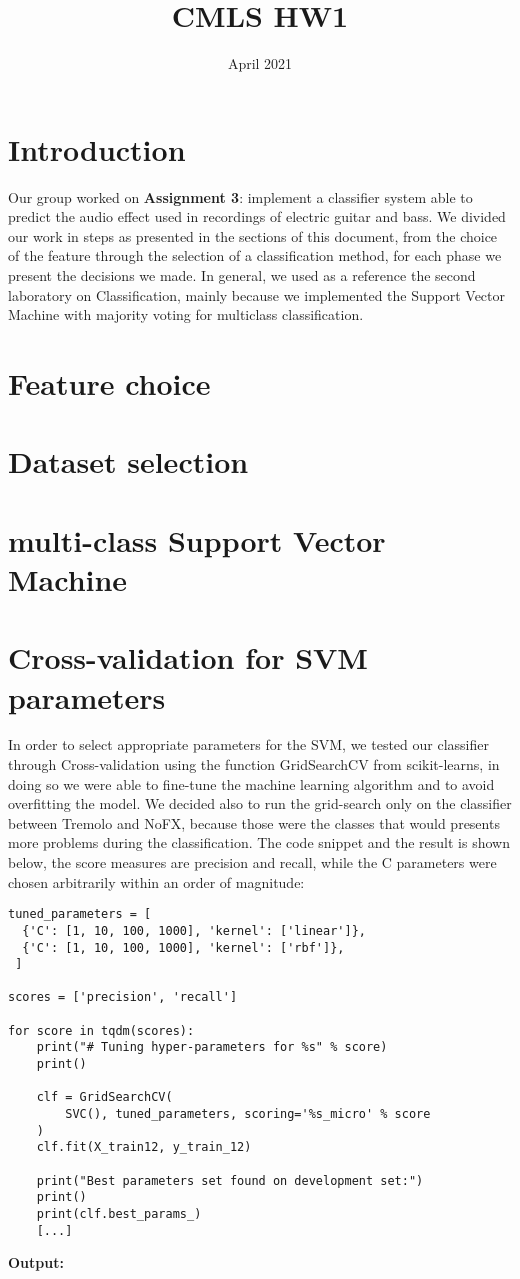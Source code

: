 \documentclass{article}
\title{CMLS HW1}
\author{}
\date{April 2021}
\begin{document}
\maketitle
\section{Introduction}
Our group worked on \textbf{Assignment 3}: implement a classifier system able to predict the audio effect used in recordings of electric guitar and bass. We divided our work in steps as presented in the sections of this document, from the choice of the feature through the selection of a classification method, for each phase we present the decisions we made. In general, we used as a reference the second laboratory on Classification, mainly because we implemented the Support Vector Machine with majority voting for multiclass classification.
\section{Feature choice}
\section{Dataset selection}
\section{multi-class Support Vector Machine}
\section{Cross-validation for SVM parameters}
In order to select appropriate parameters for the SVM, we tested our classifier through Cross-validation using the function GridSearchCV from scikit-learns, in doing so we were able to fine-tune the machine learning algorithm and to avoid overfitting the model. We decided also to run the grid-search only on the classifier between Tremolo and NoFX, because those were the classes that would presents more problems during the classification. The code snippet and the result is shown below, the score measures are precision and recall, while the C parameters were chosen arbitrarily within an order of magnitude:
\begin{verbatim}
tuned_parameters = [
  {'C': [1, 10, 100, 1000], 'kernel': ['linear']},
  {'C': [1, 10, 100, 1000], 'kernel': ['rbf']},
 ]

scores = ['precision', 'recall']

for score in tqdm(scores):
    print("# Tuning hyper-parameters for %s" % score)
    print()

    clf = GridSearchCV(
        SVC(), tuned_parameters, scoring='%s_micro' % score
    )
    clf.fit(X_train12, y_train_12)

    print("Best parameters set found on development set:")
    print()
    print(clf.best_params_)
    [...]
\end{verbatim}
\hfill \break
\textbf{Output:}
\end{document}
